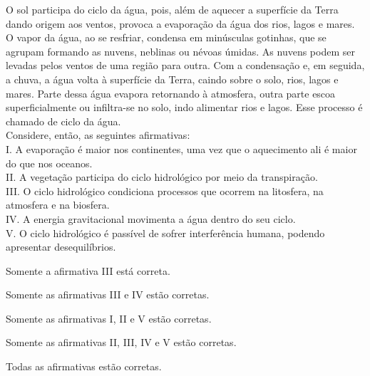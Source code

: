 \questao %
O sol participa do ciclo da água, pois, além de aquecer a superfície da Terra dando origem aos ventos, provoca a evaporação da água dos rios, lagos e mares. O vapor da água, ao se resfriar, condensa em minúsculas gotinhas, que se agrupam formando as nuvens, neblinas ou névoas úmidas. As nuvens podem ser levadas pelos ventos de uma região para outra. Com a condensação e, em seguida, a chuva, a água volta à superfície da Terra, caindo sobre o solo, rios, lagos e mares. Parte dessa água evapora retornando à atmosfera, outra parte escoa superficialmente ou infiltra-se no solo, indo alimentar rios e lagos. Esse processo é chamado de ciclo da água.\\
Considere, então, as seguintes afirmativas:\\
I. A evaporação é maior nos continentes, uma vez que o aquecimento ali é maior do que nos oceanos.\\
II. A vegetação participa do ciclo hidrológico por meio da transpiração.\\
III. O ciclo hidrológico condiciona processos que ocorrem na litosfera, na atmosfera e na biosfera.\\
IV. A energia gravitacional movimenta a água dentro do seu ciclo.\\
V. O ciclo hidrológico é passível de sofrer interferência humana, podendo apresentar desequilíbrios.\\
\begin{alternativas}
\item Somente a afirmativa III está correta.
\item Somente as afirmativas III e IV estão corretas.
\item Somente as afirmativas I, II e V estão corretas.
\item Somente as afirmativas II, III, IV e V estão corretas.
\item Todas as afirmativas estão corretas.
\end{alternativas}

